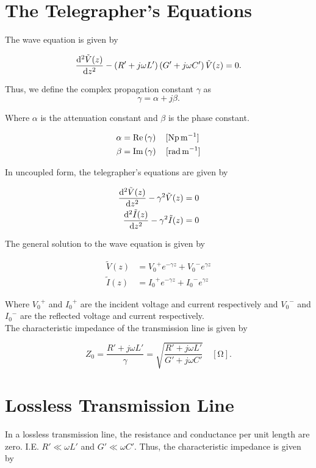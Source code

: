 \documentclass{report}
\begin{document}
\section{The Telegrapher's Equations}

The wave equation is given by

\[
	\dv[2]{\tilde{V}(z)}{z} - \lt( R' + j\omega L' \rt) \lt( G' + j\omega C' \rt) \tilde{V}(z) = 0
	.\]

Thus, we define the complex propagation constant $\gamma$ as
\[
	\gamma = \alpha + j\beta
	.\]

Where $\alpha$ is the attenuation constant and $\beta$ is the phase constant.

\begin{align*}
	\alpha & = \Re \lt( \gamma \rt)\quad [\unit{\neper\per\meter}]  \\
	\beta  & = \Im \lt( \gamma \rt)\quad [\unit{\radian\per\meter}]
\end{align*}

In uncoupled form, the telegrapher's equations are given by

\begin{align*}
	\dv[2]{\tilde{V}(z)}{z} - \gamma^2 \tilde{V}(z) & = 0 \\
	\dv[2]{\tilde{I}(z)}{z} - \gamma^2 \tilde{I}(z) & = 0
\end{align*}

The general solution to the wave equation is given by

\begin{align*}
	\tilde{V}(z) & = {V_0}^+ e^{-\gamma z} + {V_0}^- e^{\gamma z} \\
	\tilde{I}(z) & = {I_0}^+ e^{-\gamma z} + {I_0}^- e^{\gamma z}
\end{align*}

Where ${V_0}^+$ and ${I_0}^+$ are the incident voltage and current respectively and ${V_0}^-$ and ${I_0}^-$ are the reflected voltage and current respectively.\\

The characteristic impedance of the transmission line is given by

\[
	Z_0 = \frac{R' + j\omega L'}{\gamma} = \sqrt{\frac{R' + j\omega L'}{G' + j\omega C'}} \quad [\unit{\ohm}]
	.\]

\section{Lossless Transmission Line}

In a lossless transmission line, the resistance and conductance per unit length are zero. I.E. $R'\ll \omega L'$ and $G'\ll \omega C'$. Thus, the characteristic impedance is given by
\end{document}
